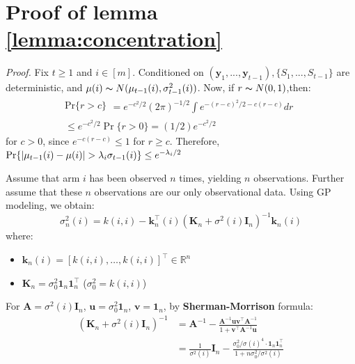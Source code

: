 \documentclass[opre,sglanonrev]{informs4}
\begin{document}
\ECSwitch

\section{Proof of lemma \ref{lemma:concentration}}
\textit{Proof.} Fix $t\geq 1$ and $i\in [m]$. Conditioned on $(\mathbf{y}_1,...,\mathbf{y}_{t-1}), \{S_1,...,S_{t-1}\}$ are deterministic, and $\mu(i)\thicksim N(\mu_{t-1}(i),\sigma_{t-1}^2(i))$. Now, if $r\thicksim N(0,1)$,then: 
$$\begin{gathered}
\mathrm{Pr}\{r>c\}
\begin{aligned}
=e^{-c^2/2}(2\pi)^{-1/2}\int e^{-(r-c)^2/2-c(r-c)}dr
\end{aligned} \\
\leq e^{-c^2/2}\Pr\{r>0\}=(1/2)e^{-c^2/2}
\end{gathered}$$
for $c>0$, since $e^{-c(r-c)}\leq 1$ for $r\geq c$. Therefore, $\textnormal{Pr}\{|\mu_{t-1}(i)-\mu(i)|>\lambda_i \sigma_{t-1}(i)\}\leq e^{-\lambda_i/2}$

Assume that arm $i$ has been observed $n$ times, yielding $n$ observations. Further assume that these $n$ observations are our only observational data. Using GP modeling, we obtain:
\[
\sigma_n^2(i) = k(i,i) - \mathbf{k}_n^\top(i)(\mathbf{K}_n + \sigma^2(i)\mathbf{I}_n)^{-1}\mathbf{k}_n(i)
\]
where:
\begin{itemize}
    \item $\mathbf{k}_n(i) = [k(i,i),\dots,k(i,i)]^\top \in \mathbb{R}^n$
    \item $\mathbf{K}_n = \sigma_0^2\mathbf{1}_n\mathbf{1}_n^\top$ ($\sigma_0^2 = k(i,i)$)
\end{itemize} %

For $\mathbf{A} = \sigma^2(i)\mathbf{I}_n$, $\mathbf{u} = \sigma_0^2\mathbf{1}_n$, $\mathbf{v} = \mathbf{1}_n$, by \textbf{Sherman-Morrison} formula:
\begin{equation*}
\begin{aligned}
(\mathbf{K}_n + \sigma^2(i)\mathbf{I}_n)^{-1} &= \mathbf{A}^{-1} - \frac{\mathbf{A}^{-1}\mathbf{u}\mathbf{v}^\top\mathbf{A}^{-1}}{1 + \mathbf{v}^\top\mathbf{A}^{-1}\mathbf{u}} \\
&= \frac{1}{\sigma^2(i)}\mathbf{I}_n - \frac{\sigma_0^2/\sigma(i)^4 \cdot \mathbf{1}_n\mathbf{1}_n^\top}{1 + n\sigma_0^2/\sigma^2(i)}
\end{aligned}
\end{equation*} 
\end{document}
